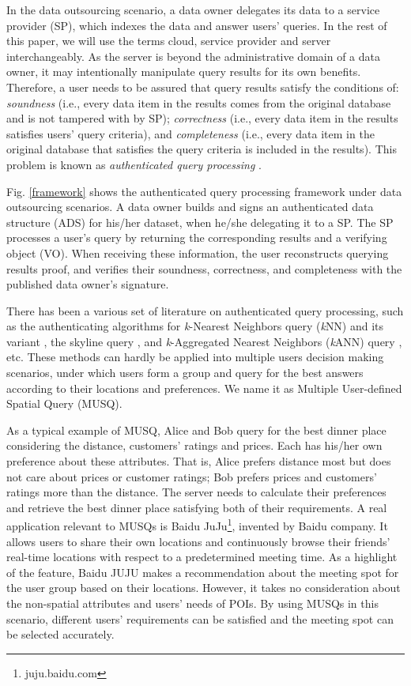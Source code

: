 \documentclass[10pt, conference, compsocconf]{IEEEtran}
\begin{document}
In the data outsourcing scenario, a data owner delegates its data to a service provider (SP), which indexes the data and answer users' queries. In the rest of this paper, we will use the terms cloud, service provider and server interchangeably. As the server is beyond the administrative domain of a data owner, it may intentionally manipulate query results for its own benefits. Therefore, a user needs to be assured that query results satisfy the conditions of: \emph{soundness} (i.e., every data item in the results comes from the original database and is not tampered with by SP); \emph{correctness} (i.e., every data item in the results satisfies users' query criteria), and \emph{completeness} (i.e., every data item in the original database that satisfies the query criteria is included in the results). This problem is known as \emph{authenticated query processing} \cite{SIGMOD2005,ICDE2004}.

Fig. \ref{framework} shows the authenticated query processing framework under data outsourcing scenarios. A data owner builds and signs an authenticated data structure (ADS) for his/her dataset, when he/she delegating it to a SP. The SP processes a user's query by returning the corresponding results and a verifying object (VO). When receiving these information, the user reconstructs querying results proof, and verifies their soundness, correctness, and completeness with the published data owner's signature.

There has been a various set of literature on authenticated query processing, such as the authenticating algorithms for \emph{k}-Nearest Neighbors query (\emph{k}NN) \cite{ICDE2011} and its variant \cite{li2015authentication}, the skyline query \cite{lin2011authentication, lin2014authenticating}, and \emph{k}-Aggregated Nearest Neighbors (\emph{k}ANN) query \cite{hu2013spatial}, etc. These methods can hardly be applied into multiple users decision making scenarios, under which users form a group and query for the best answers according to their locations and preferences. We name it as Multiple User-defined Spatial Query (MUSQ).

As a typical example of MUSQ, Alice and Bob query for the best dinner place considering the distance, customers' ratings and prices. Each has his/her own preference about these attributes. That is, Alice prefers distance most but does not care about prices or customer ratings; Bob prefers prices and customers' ratings more than the distance. The server needs to calculate their preferences and retrieve the best dinner place satisfying both of their requirements. A real application relevant to MUSQs is Baidu JuJu\footnote{juju.baidu.com}, invented by Baidu company. It allows users to share their own locations and continuously browse their friends' real-time locations with respect to a predetermined meeting time. As a highlight of the feature, Baidu JUJU makes a recommendation about the meeting spot for the user group based on their locations. However, it takes no consideration about the non-spatial attributes and users' needs of POIs. By using MUSQs in this scenario, different users' requirements can be satisfied and the meeting spot can be selected accurately.
 
\end{document}
